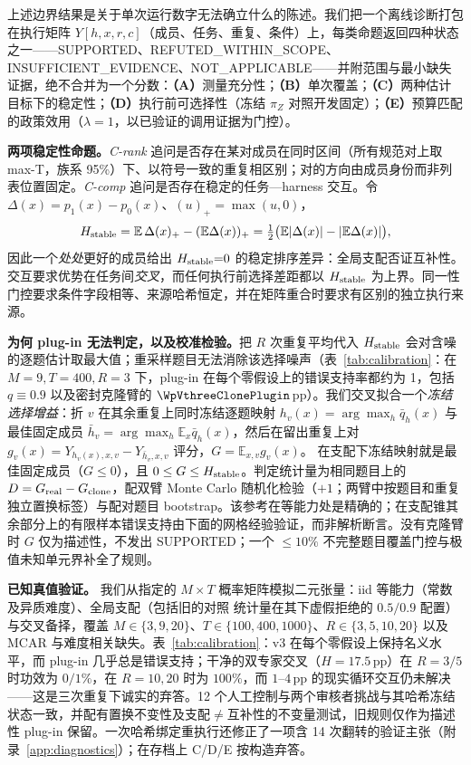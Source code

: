 上述边界结果是关于单次运行数字无法确立什么的陈述。我们把一个离线诊断打包在执行矩阵 $Y[h,x,r,c]$（成员、任务、重复、条件）上，每类命题返回四种状态之一——SUPPORTED、REFUTED\_WITHIN\_SCOPE、INSUFFICIENT\_EVIDENCE、NOT\_APPLICABLE——并附范围与最小缺失证据，绝不合并为一个分数：\textbf{（A）}测量充分性；\textbf{（B）}单次覆盖；\textbf{（C）}两种估计目标下的稳定性；\textbf{（D）}执行前可选择性（冻结 $\pi_Z$ 对照开发固定）；\textbf{（E）}预算匹配的政策效用（$\lambda{=}1$，以已验证的调用证据为门控）。

\textbf{两项稳定性命题。}\emph{C-rank} 追问是否存在某对成员在同时区间（所有规范对上取 max-T，族系 95\%）下、以符号一致的重复相区别；对的方向由成员身份而非列表位置固定。\emph{C-comp} 追问是否存在稳定的任务—harness 交互。令 $\Delta(x)=p_1(x)-p_0(x)$、$(u)_+=\max(u,0)$，
\begin{equation}
H_{\rm stable}=\mathbb{E}\,\Delta(x)_+-(\mathbb{E}\Delta(x))_+
=\tfrac12\bigl(\mathbb{E}|\Delta(x)|-|\mathbb{E}\Delta(x)|\bigr),
\label{eq:identity}
\end{equation}
因此一个\emph{处处}更好的成员给出 $H_{\rm stable}{=}0$ 的稳定排序差异：全局支配否证互补性。交互要求优势在任务间\emph{交叉}，而任何执行前选择差距都以 $H_{\rm stable}$ 为上界。同一性门控要求条件字段相等、来源哈希恒定，并在矩阵重合时要求有区别的独立执行来源。

\textbf{为何 plug-in 无法判定，以及校准检验。}把 $R$ 次重复平均代入 $H_{\rm stable}$ 会对含噪的逐题估计取最大值；重采样题目无法消除该选择噪声（表~\ref{tab:calibration}：在 $M{=}9,T{=}400,R{=}3$ 下，plug-in 在每个零假设上的错误支持率都约为 1，包括 $q\equiv0.9$ 以及密封克隆臂的 $\WpVthreeClonePlugin$\,pp）。我们交叉拟合一个\emph{冻结选择增益}：折 $v$ 在其余重复上同时冻结逐题映射 $h_v(x)=\arg\max_h\bar q_h(x)$ 与最佳固定成员 $\bar h_v=\arg\max_h\mathbb E_x\bar q_h(x)$，然后在留出重复上对 $g_v(x)=Y_{h_v(x),x,v}-Y_{\bar h_v,x,v}$ 评分，$G=\mathbb E_{x,v}g_v(x)$。\label{sec:calibration-test}
在支配下冻结映射就是最佳固定成员（$G\le0$），且 $0\le G\le H_{\rm stable}$。判定统计量为相同题目上的 $D=G_{\rm real}-G_{\rm clone}$，配双臂 Monte Carlo 随机化检验（$+1$；两臂中按题目和重复独立置换标签）与配对题目 bootstrap。该参考在等能力处是精确的；在支配锥其余部分上的有限样本错误支持由下面的网格经验验证，而非解析断言。没有克隆臂时 $G$ 仅为描述性，不发出 SUPPORTED；一个 $\le10\%$ 不完整题目覆盖门控与极值未知单元界补全了规则。

\textbf{已知真值验证。}\label{sec:calibration}
我们从指定的 $M\times T$ 概率矩阵模拟二元张量：iid 等能力（常数及异质难度）、全局支配（包括旧的对照 \bare{} 统计量在其下虚假拒绝的 $0.5/0.9$ 配置）与交叉备择，覆盖 $M\in\{3,9,20\}$、$T\in\{100,400,1000\}$、$R\in\{3,5,10,20\}$ 以及 MCAR 与难度相关缺失。表~\ref{tab:calibration}：v3 在每个零假设上保持名义水平，而 plug-in 几乎总是错误支持；干净的双专家交叉（$H{=}17.5$\,pp）在 $R{=}3/5$ 时功效为 $0/1\%$，在 $R{=}10,20$ 时为 $100\%$，而 $1$--$4$\,pp 的现实循环交互仍未解决——这是三次重复下诚实的弃答。12 个人工控制与两个审核者挑战与其哈希冻结状态一致，并配有置换不变性及支配$\ne$互补性的不变量测试，旧规则仅作为描述性 plug-in 保留。一次哈希绑定重执行还修正了一项含 14 次翻转的验证主张（附录~\ref{app:diagnostics}）；在存档上 C/D/E 按构造弃答。

\begin{table}[h]
\centering\small

\caption{\textbf{$M{=}9,T{=}400$ 下的已知真值校准。}零假设：错误支持 \%（名义 5\%）；备择：功效；完整网格见附录~\ref{app:diagnostics}。}
\label{tab:calibration}
\end{table}
